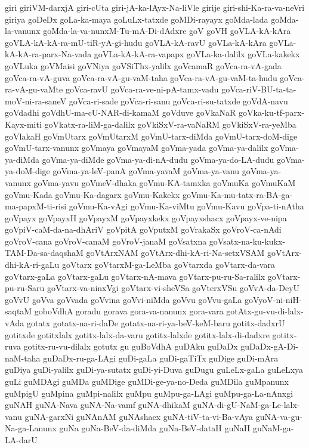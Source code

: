 {giri
giriVM-darxjA
giri-cUta
giri-jA-ka-lAyx-Na-liVle
girije
giri-shi-Ka-ra-va-neVri
giriya
goDeDx
goLa-ka-maya
goLuLx-tatxde
goMDi-rayayx
goMda-lada
goMda-la-vanunx
goMda-la-va-nunxM-Tu-mA-Di-dAdxre
goV
goVH
goVLA-kA-kAra
goVLA-kA-kA-ra-mU-tiR-yA-gi-hudu
goVLA-kA-ravU
goVLa-kA-kAra
goVLa-kA-kA-ra-parx-Na-vada
goVLa-kA-kA-ra-vapapx
goVLa-ka-dalilx
goVLa-kakekx
goVLuka
goVMaisi
goVNiya
goVSiThx-yalilx
goVcamaR
goVca-ra-vA-gada
goVca-ra-vA-guva
goVca-ra-vA-gu-vaM-taha
goVca-ra-vA-gu-vaM-ta-hudu
goVca-ra-vA-gu-vaMte
goVca-ravU
goVca-ra-ve-ni-pA-tamx-vadu
goVca-riV-BU-ta-ta-moV-ni-ra-saneV
goVca-ri-sade
goVca-ri-sanu
goVca-ri-su-tatxde
goVdA-navu
goVdadhi
goVdhU-ma-cU-NAR-di-kamaM
goVduve
goVkaNaR
goVka-ku-tf-parx-Kayx-miti
goVkatx-ra-liM-ga-dalilx
goVkiSxV-ra-vaNaRM
goVkiSxV-ra-yeMba
goVlakaH
goVmUtarx
goVmUtarxM
goVmU-tarx-diMda
goVmU-tarx-doM-dige
goVmU-tarx-vanunx
goVmaya
goVmayaM
goVma-yada
goVma-ya-dalilx
goVma-ya-diMda
goVma-ya-diMde
goVma-ya-di-nA-dudu
goVma-ya-do-LA-dudu
goVma-ya-doM-dige
goVma-ya-leV-panA
goVma-yavaM
goVma-ya-vanu
goVma-ya-vanunx
goVma-yavu
goVmeV-dhaka
goVmu-KA-tamxka
goVmuKa
goVmuKaM
goVmu-Kada
goVmu-Ka-dagarx
goVmu-Kakekx
goVmu-Ka-mu-tatx-ra-BA-ga-ma-papxM-ti-risi
goVmu-Ka-vAgi
goVmu-Ka-viMtu
goVmu-Kavu
goVpa-ti-nAtha
goVpayx
goVpayxH
goVpayxM
goVpayxkekx
goVpayxshacx
goVpayx-ve-nipa
goVpiV-caM-da-na-dhAriV
goVpitA
goVputxM
goVrakaSx
goVroV-ca-nAdi
goVroV-cana
goVroV-canaM
goVroV-janaM
goVsatxna
goVsatx-na-ku-kukx-TAM-Da-sa-daqshaM
goVtArxNAM
goVtArx-dhi-kA-ri-Na-setxVSAM
goVtArx-dhi-kA-ri-gaLu
goVtarx
goVtarxM-ga-LeMba
goVtarxda
goVtarx-da-vara
goVtarx-gaLa
goVtarx-gaLu
goVtarx-nA-mava
goVtarx-pu-ru-Sa-ralilx
goVtarx-pu-ru-Saru
goVtarx-va-ninxVgi
goVtarx-vi-sheVSa
goVterxVSu
goVvA-da-DeyU
goVvU
goVva
goVvada
goVvina
goVvi-niMda
goVvu
goVvu-gaLa
goVyoV-ni-niH-saqtaM
goboVdhA
goradu
gorava
gora-va-nanunx
gora-vara
gotAtx-gu-vu-di-lalx-vAda
gotatx
gotatx-na-ri-daDe
gotatx-na-ri-ya-beV-keM-baru
gotitx-dadxrU
gotitxde
gotitxlalx
gotitx-lalx-da-varu
gotitx-lalxde
gotitx-lalx-di-dadxre
gotitx-ruva
gotitx-ru-vu-dilalx
gotutx
gu
guBoVdhA
guDAku
guDaDx
guDaDx-gA-Di-naM-taha
guDaDx-ru-ga-LAgi
guDi-gaLa
guDi-gaTiTx
guDige
guDi-mAra
guDiya
guDi-yalilx
guDi-ya-sutatx
guDi-yi-Duva
guDugu
guLeLx-gaLa
guLeLxya
guLi
guMDAgi
guMDa
guMDige
guMDi-ge-ya-no-Deda
guMDila
guMpanunx
guMpigU
guMpina
guMpi-nalilx
guMpu
guMpu-ga-LAgi
guMpu-ga-La-nAnxgi
guNAH
guNA-Nava
guNA-Na-vamf
guNA-dhikaM
guNA-di-gU-NaM-ga-Le-lalx-vanu
guNA-garxNi
guNAnAM
guNAshacx
guNA-tiV-ta-vi-Ba-vAya
guNA-va-gu-Na-ga-Lanunx
guNa
guNa-BeV-da-diMda
guNa-BeV-dataH
guNaH
guNaM-ga-LA-darU
}
